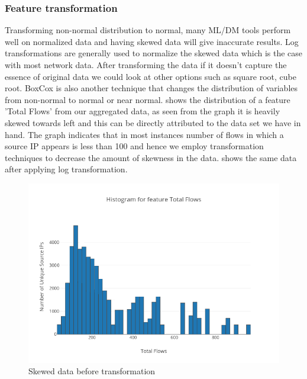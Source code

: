 \subsubsection{Feature transformation} 
Transforming non-normal distribution to normal, many ML/DM tools perform well on normalized data and having skewed data will give inaccurate results. Log transformations are generally used to normalize the skewed data which is the case with most network data. After transforming the data if it doesn't capture the essence of original data we could look at other options such as square root, cube root. BoxCox is also another technique that changes the distribution of variables from non-normal to normal or near normal.  shows the distribution of a feature 'Total Flows' from our aggregated data, as seen from the graph it is heavily skewed towards left and this can be directly attributed to the data set we have in hand. The graph indicates that in most instances number of flows in which a source IP appears is less than 100 and hence we employ transformation techniques to decrease the amount of skewness in the data.   shows the same data after applying log transformation. 

\begin{figure}[t]
	\centerline{\includegraphics[scale = 1.1]{feature.png}}
	\caption{Skewed data before transformation}%
\end{figure}

